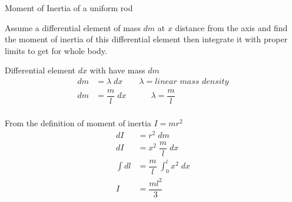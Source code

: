 \documentclass[12 pt]{book}
\makeatletter
\newcommand*\Times{\fontfamily{ptm}\selectfont}
\newcommand{\AxisRotator}[1][rotate=0]{%
    \tikz [x=0.25cm,y=0.60cm,line width=.2ex,-stealth,#1] \draw (0,0) arc (-150:150:1 and 1);%
}
\newcommand{\physics}{\normalsize{\textcolor{head}{\textls*[100]{{\hspace*{75 mm} @10xphysics}}}}}
\newenvironment{my-title}
{
	\begin{center}
	\begin{itshape}
	\large\Times\textit{}
}
{
	\end{itshape}
	\end{center}
}
\newenvironment{definition}
{
	\begin{center}
	\begin{itshape}
	\normalsize\Times\textit{}
}
{
	\end{itshape}
	\end{center}
}
\newenvironment{note}
{
	\begin{center}
	\begin{itshape}
	\normalsize\Times\textit{}
}
{
	\end{itshape}
	\end{center}
}
\makeatother
\begin{document}
\begin{my-title}
Moment of Inertia of a uniform rod
\end{my-title}



{\physics}

\begin{center}
\end{center}

\begin{note}
Assume a differential element of mass $dm$ at $x$ distance from the axis and find the moment of inertia of this differential element then integrate it with proper limits to get  for whole body.
\end{note}


\pagebreak


\begin{note}
Differential element $dx$ with have mass $dm$
\begin{align*}
dm &= \lambda \; dx \quad \quad \lambda = \textit{linear mass density} \\
dm &= \dfrac{m}{l}  \; dx \quad \quad \quad \lambda = \dfrac{m}{l}\\
\end{align*}

From the definition of moment of inertia $I=mr^2$
\begin{align*}
dI &= r^2 \; dm \\[4 mm]
dI  &= x^2 \; \dfrac{m}{l}  \; dx \\[4 mm]
\int dl &= \dfrac{m}{l}  \; \int_0^l x^2 \; dx \\[4 mm]
I &= \dfrac{ml^2}{3}
\end{align*}

\end{note}
\end{document}
